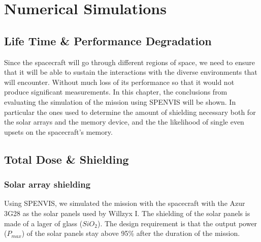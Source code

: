 
\section{\label{sec:simulations}Numerical Simulations}

\subsection{\label{subsec:life}Life Time \& Performance Degradation}

Since the spacecraft will go through different regions of space, we need to ensure that it will be able to sustain the interactions with the diverse environments that will encounter. Without much loss of its performance so that it would not produce significant measurements. In this chapter, the conclusions from evaluating the simulation of the mission using SPENVIS will be shown. In particular the ones used to determine the amount of shielding necessary both for the solar arrays and the memory device, and the the likelihood of single even upsets on the spacecraft's memory.


\subsection{\label{subsec:shield}Total Dose \& Shielding}
\subsubsection{Solar array shielding}

Using SPENVIS, we simulated the mission with the spacecraft with the Azur 3G28 as the solar panels used by Willzyx I. The shielding of the solar panels is made of a lager of glass ($SiO_2$). The design requirement is that the output power ($P_{max}$) of the solar panels stay above 95\% after the duration of the mission. 

